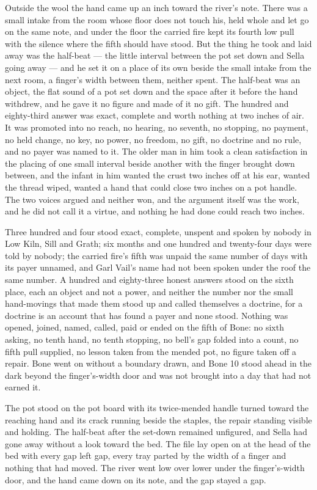 Outside the wool the hand came up an inch toward the river's note. There was a small intake from the room whose floor does not touch his, held whole and let go on the same note, and under the floor the carried fire kept its fourth low pull with the silence where the fifth should have stood. But the thing he took and laid away was the half-beat --- the little interval between the pot set down and Sella going away --- and he set it on a place of its own beside the small intake from the next room, a finger's width between them, neither spent. The half-beat was an object, the flat sound of a pot set down and the space after it before the hand withdrew, and he gave it no figure and made of it no gift. The hundred and eighty-third answer was exact, complete and worth nothing at two inches of air. It was promoted into no reach, no hearing, no seventh, no stopping, no payment, no held change, no key, no power, no freedom, no gift, no doctrine and no rule, and no payer was named to it. The older man in him took a clean satisfaction in the placing of one small interval beside another with the finger brought down between, and the infant in him wanted the crust two inches off at his ear, wanted the thread wiped, wanted a hand that could close two inches on a pot handle. The two voices argued and neither won, and the argument itself was the work, and he did not call it a virtue, and nothing he had done could reach two inches.

Three hundred and four stood exact, complete, unspent and spoken by nobody in Low Kiln, Sill and Grath; six months and one hundred and twenty-four days were told by nobody; the carried fire's fifth was unpaid the same number of days with its payer unnamed, and Garl Vail's name had not been spoken under the roof the same number. A hundred and eighty-three honest answers stood on the sixth place, each an object and not a power, and neither the number nor the small hand-movings that made them stood up and called themselves a doctrine, for a doctrine is an account that has found a payer and none stood. Nothing was opened, joined, named, called, paid or ended on the fifth of Bone: no sixth asking, no tenth hand, no tenth stopping, no bell's gap folded into a count, no fifth pull supplied, no lesson taken from the mended pot, no figure taken off a repair. Bone went on without a boundary drawn, and Bone 10 stood ahead in the dark beyond the finger's-width door and was not brought into a day that had not earned it.

The pot stood on the pot board with its twice-mended handle turned toward the reaching hand and its crack running beside the staples, the repair standing visible and holding. The half-beat after the set-down remained unfigured, and Sella had gone away without a look toward the bed. The file lay open on  at the head of the bed with every gap left gap, every tray parted by the width of a finger and nothing that had moved. The river went low over lower under the finger's-width door, and the hand came down on its note, and the gap stayed a gap.
